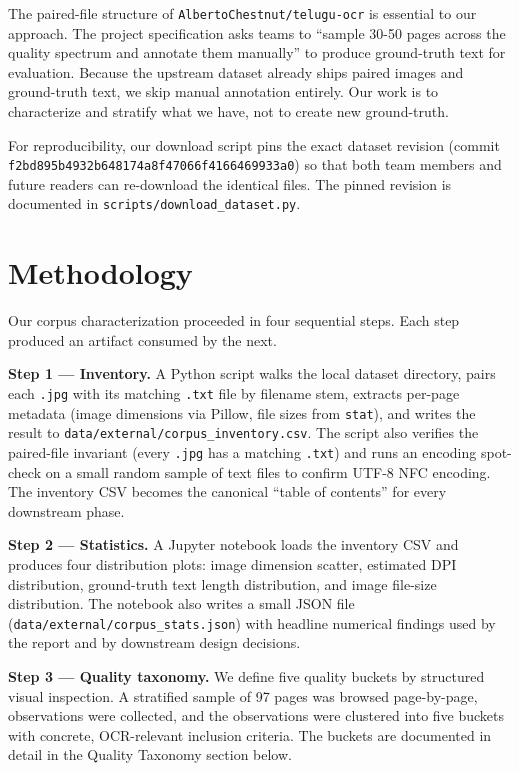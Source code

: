 \documentclass[
  letterpaper,
  DIV=11,
  numbers=noendperiod]{scrartcl}
\begin{document}
The paired-file structure of \texttt{AlbertoChestnut/telugu-ocr} is
essential to our approach. The project specification asks teams to
``sample 30-50 pages across the quality spectrum and annotate them
manually'' to produce ground-truth text for evaluation. Because the
upstream dataset already ships paired images and ground-truth text, we
skip manual annotation entirely. Our work is to characterize and
stratify what we have, not to create new ground-truth.

For reproducibility, our download script pins the exact dataset revision
(commit \texttt{f2bd895b4932b648174a8f47066f4166469933a0}) so that both
team members and future readers can re-download the identical files. The
pinned revision is documented in \texttt{scripts/download\_dataset.py}.

\section{Methodology}\label{methodology}

Our corpus characterization proceeded in four sequential steps. Each
step produced an artifact consumed by the next.

\textbf{Step 1 --- Inventory.} A Python script walks the local dataset
directory, pairs each \texttt{.jpg} with its matching \texttt{.txt} file
by filename stem, extracts per-page metadata (image dimensions via
Pillow, file sizes from \texttt{stat}), and writes the result to
\texttt{data/external/corpus\_inventory.csv}. The script also verifies
the paired-file invariant (every \texttt{.jpg} has a matching
\texttt{.txt}) and runs an encoding spot-check on a small random sample
of text files to confirm UTF-8 NFC encoding. The inventory CSV becomes
the canonical ``table of contents'' for every downstream phase.

\textbf{Step 2 --- Statistics.} A Jupyter notebook loads the inventory
CSV and produces four distribution plots: image dimension scatter,
estimated DPI distribution, ground-truth text length distribution, and
image file-size distribution. The notebook also writes a small JSON file
(\texttt{data/external/corpus\_stats.json}) with headline numerical
findings used by the report and by downstream design decisions.

\textbf{Step 3 --- Quality taxonomy.} We define five quality buckets by
structured visual inspection. A stratified sample of 97 pages was
browsed page-by-page, observations were collected, and the observations
were clustered into five buckets with concrete, OCR-relevant inclusion
criteria. The buckets are documented in detail in the Quality Taxonomy
section below.
\end{document}
